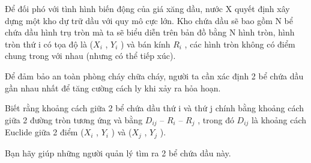 Để đối phó với tình hình biến động của giá xăng dầu, nước X quyết định xây dựng một kho dự trữ dầu với quy mô cực lớn. Kho chứa dầu sẽ bao gồm N bể chứa dầu hình trụ tròn mà ta sẽ biểu diễn trên bản đồ bằng N hình tròn, hình tròn thứ i có tọa độ là ($X_{i}$   , $Y_{i}$   ) và bán kính $R_{i}$   , các hình tròn không có điểm chung trong với nhau (nhưng có thể tiếp xúc).  

   Để đảm bảo an toàn phòng cháy chữa cháy, người ta cần xác định 2 bể chứa dầu gần nhau nhất để tăng cường cách ly khi xảy ra hỏa hoạn.  

   Biết rằng khoảng cách giữa 2 bể chứa dầu thứ i và thứ j chính bằng khoảng cách giữa 2 đường tròn tương ứng và bằng $D_{ij}$   – $R_{i}$   – $R_{j}$   , trong đó $D_{ij}$   là khoảng cách Euclide giữa 2 điểm ($X_{i}$   , $Y_{i}$   ) và ($X_{j}$   , $Y_{j}$   ).  

   Bạn hãy giúp những người quản lý tìm ra 2 bể chứa dầu này.